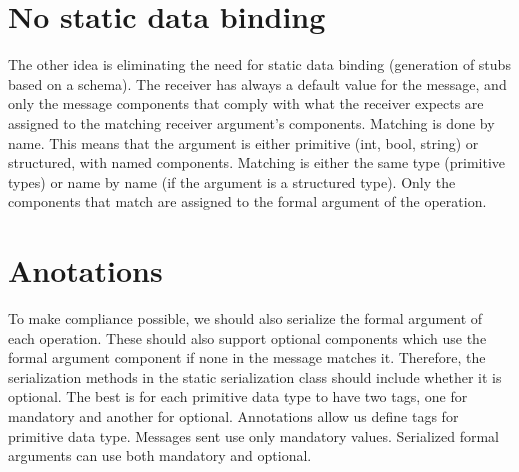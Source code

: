 \section{No static data binding}
\label{section:noDataBinding}

The other idea is eliminating the need for static data binding (generation of stubs based on a schema). The receiver has
always a default value for the message, and only the message components that comply with what the receiver expects are
assigned to the matching receiver argument's components. Matching is done by name. This means that the argument is either
primitive (int, bool, string) or structured, with named components. Matching is either the same type (primitive types) or
name by name (if the argument is a structured type). Only the components that match are assigned to the formal argument of
the operation.


\section{Anotations}
\label{section:anotations}
To make compliance possible, we should also serialize the formal argument of each operation. These should also support
optional components which use the formal argument component if none in the message matches it. Therefore,
the serialization methods in the static serialization class should include  whether it is optional.
The best is for each primitive data type to have two tags, one for mandatory and another for optional. Annotations allow us
define tags for primitive data type.
Messages sent use only mandatory values. Serialized formal arguments can use both mandatory and optional.




